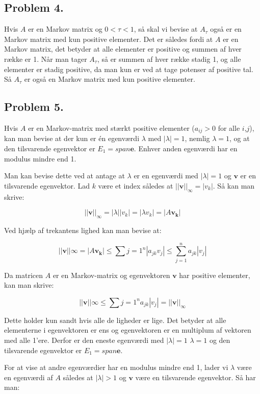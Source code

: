 \subsection*{Problem 4.}

Hvis $A$ er en Markov matrix og $0 < \tau < 1$, så skal vi bevise at $A_{\tau}$ også er en Markov matrix med kun positive elementer. Det er således fordi at $A$ er en Markov matrix, det betyder at alle elementer er positive og summen af hver række er 1. Når man tager $A_{\tau}$, så er summen af hver række stadig 1, og alle elementer er stadig positive, da man kun er ved at tage potenser af positive tal. Så $A_{\tau}$ er også en Markov matrix med kun positive elementer.

\subsection*{Problem 5.}

Hvis $A$ er en Markov-matrix med stærkt positive elementer ($a_{ij} > 0$ for alle $i$,$j$), kan man bevise at der kun er én egenværdi $\lambda$ med $|\lambda| = 1$, nemlig $\lambda = 1$, og at den tilsvarende egenvektor er $E_1 = span {\mathbf{e}}$. Enhver anden egenværdi har en modulus mindre end 1.

Man kan bevise dette ved at antage at $\lambda$ er en egenværdi med $|\lambda| = 1$ og $\mathbf{v}$ er en tilsvarende egenvektor. Lad $k$ være et index således at $||\mathbf{v}||_\infty = |v_k|$. Så kan man skrive:

$$||\mathbf{v}||_\infty = |\lambda ||v_k| = |\lambda v_k| = |A\mathbf{v_k}|$$

Ved hjælp af trekantens lighed kan man bevise at:

$$||\mathbf{v}||\infty = |A\mathbf{v_k}| \leq \sum{j=1}^n |a_{jk} v_j| \leq \sum_{j=1}^n a_{jk} |v_j|$$

Da matricen $A$ er en Markov-matrix og egenvektoren $\mathbf{v}$ har positive elementer, kan man skrive:

$$||\mathbf{v}||\infty \leq \sum{j=1}^n a_{jk} |v_j| = ||\mathbf{v}||_\infty$$

Dette holder kun sandt hvis alle de ligheder er lige. Det betyder at alle elementerne i egenvektoren er ens og egenvektoren er en multiplum af vektoren med alle 1'ere. Derfor er den eneste egenværdi med $|\lambda| = 1$ $\lambda = 1$ og den tilsvarende egenvektor er $E_1 = span {\mathbf{e}}$.

For at vise at andre egenværdier har en modulus mindre end 1, lader vi $\lambda$ være en egenværdi af $A$ således at $|\lambda| > 1$ og $\mathbf{v}$ være en tilsvarende egenvektor. Så har man:

